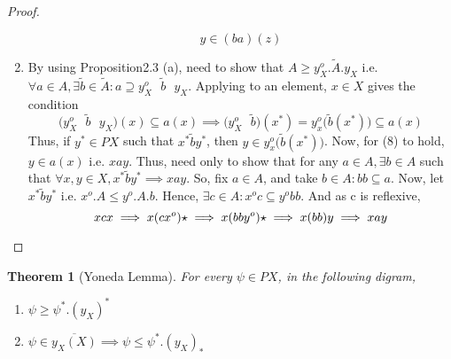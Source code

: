 \documentclass[18pt,a4paper]{article}
\newtheorem{theorem}{Theorem}[section]
\theoremstyle{definition}
\begin{document}
\begin{proof}
\begin{enumerate}[label=(\alph*)]
\[		y \in (ba)(z)\]
	\item By using Proposition2.3 (a), need to show that $A\geq y_X^o.\tilde{A}.y_X$ i.e. $\forall
		a\in A, \exists \tilde{b}\in \tilde{A} :  a \supseteq y_X^o \text{ } \tilde{b} \text{ } y_X $.
		Applying to an element, $x\in X$ gives the condition
		\begin{equation}
			\Big( y_X^o \text{ } \tilde{b} \text{ } y_X \Big)(x) \subseteq a(x)
			\implies \Big( y_X^o \text{ } \tilde{b} \Big) (x^*)= y_x^o
			\Big(\tilde{b}(x^*)\Big) \subseteq a(x)
		\end{equation}
		Thus, if $y^* \in PX$ such that $x^* \tilde{b} y^*$, then
		$y \in y_x^o\Big(\tilde{b}(x^*)\Big)$. Now, for (8) to hold, $y \in a(x)$ i.e. $xay$. Thus,
		need only to show that for any $a\in A, \exists b \in A $ such that $\forall x,y \in X,
		x^* \tilde{b}y^* \implies xay $. So, fix $a\in A$, and take $b \in A: bb \subseteq a$.
		Now, let $x^* \tilde{b}y^*$ i.e. $x^o.A \leq y^o .A .b$.
		Hence, $\exists c \in A: x^oc \subseteq y^o bb$. And as c is reflexive,
		\[ xcx \implies x(cx^o)\star \implies x(bby^o)\star \implies x(bb)y \implies xay \qedhere \]
\end{enumerate}
\end{proof}
\begin{theorem}[Yoneda Lemma] %
	For every $\psi \in PX$, in the following digram,
	\begin{enumerate}[label=(\alph*)]
		\item $\psi \geq \psi^*.(y_X)^*$
		\item $\psi \in \overline{y_X(X)} \implies \psi \leq \psi^*.(y_X)_*$
	\end{enumerate}
\end{theorem}
\end{document}
